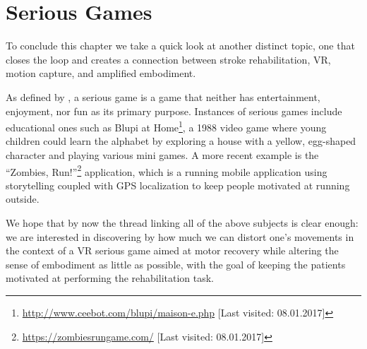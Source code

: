 \section{Serious Games}

To conclude this chapter we take a quick look at another distinct topic, one that closes the loop and creates a connection between stroke rehabilitation, VR, motion capture, and amplified embodiment.

As defined by \cite{djaouti2011classifying,chen2005proof}, a serious game is a game that neither has entertainment, enjoyment, nor fun as its primary purpose. Instances of serious games include educational ones such as Blupi at Home\footnote{\url{http://www.ceebot.com/blupi/maison-e.php} [Last visited: 08.01.2017]}, a 1988 video game where young children could learn the alphabet by exploring a house with a yellow, egg-shaped character and playing various mini games. A more recent example is the ``Zombies, Run!''\footnote{\url{https://zombiesrungame.com/} [Last visited: 08.01.2017]} application, which is a running mobile application using storytelling coupled with GPS localization to keep people motivated at running outside.

We hope that by now the thread linking all of the above subjects is clear enough: we are interested in discovering by how much we can distort one's movements in the context of a VR serious game aimed at motor recovery while altering the sense of embodiment as little as possible, with the goal of keeping the patients motivated at performing the rehabilitation task.
